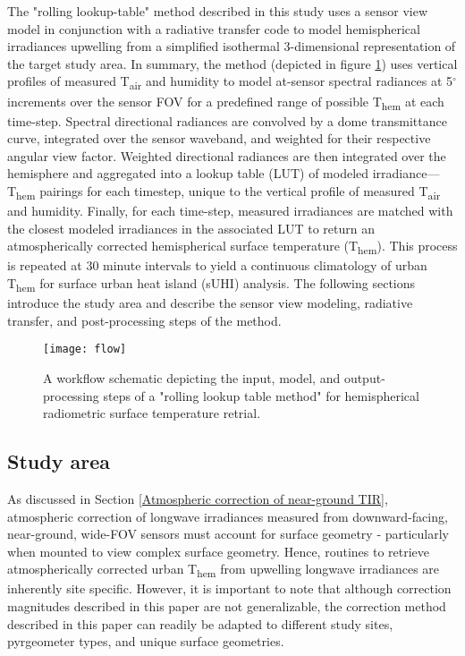 The "rolling lookup-table" method described in this study uses a sensor view model in conjunction with a radiative transfer code to model hemispherical irradiances upwelling from a simplified isothermal 3-dimensional representation of the target study area. In summary, the method (depicted in figure \ref{flow}) uses vertical profiles of measured T\textsubscript{air} and humidity to model at-sensor spectral radiances at 5$^{\circ}$ increments over the sensor FOV for a predefined range of possible T\textsubscript{hem} at each time-step. Spectral directional radiances are convolved by a dome transmittance curve, integrated over the sensor waveband, and weighted for their respective angular view factor. Weighted directional radiances are then integrated over the hemisphere and aggregated into a lookup table (LUT) of modeled irradiance---T\textsubscript{hem} pairings for each timestep, unique to the vertical profile of measured T\textsubscript{air} and humidity. Finally, for each time-step, measured irradiances are matched with the closest modeled irradiances in the associated LUT to return an atmospherically corrected hemispherical surface temperature (T\textsubscript{hem}). This process is repeated at 30 minute intervals to yield a continuous climatology of urban T\textsubscript{hem} for surface urban heat island (sUHI) analysis. The following sections introduce the study area and describe the sensor view modeling, radiative transfer, and post-processing steps of the method.



\begin{figure}[!ht]
	\texttt{[image: flow]}
	\label{flow}
	\caption{A workflow schematic depicting the input, model, and output-processing steps of a "rolling lookup table method" for hemispherical radiometric surface temperature retrial.}
\end{figure}

\subsection{Study area}

As discussed in Section \ref{Atmospheric correction of near-ground TIR}, atmospheric correction of longwave irradiances measured from downward-facing, near-ground, wide-FOV sensors must account for surface geometry - particularly when mounted to view complex surface geometry. Hence, routines to retrieve atmospherically corrected urban T\textsubscript{hem} from upwelling longwave irradiances are inherently site specific. However, it is important to note that although correction magnitudes described in this paper are not generalizable, the correction method described in this paper can readily be adapted to different study sites, pyrgeometer types, and unique surface geometries.

